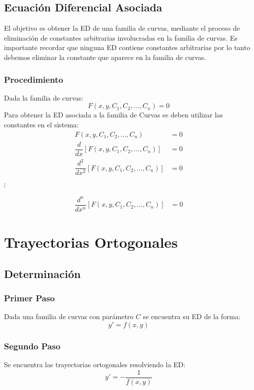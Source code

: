 \subsection{Ecuación Diferencial Asociada}
El objetivo es obtener la ED de una familia de curvas, mediante el proceso de eliminación de constantes arbitrarias involucradas en la familia de curvas. Es importante recordar que ninguna ED contiene constantes arbitrarias por lo tanto debemos eliminar la constante que aparece en la familia de curvas.
\subsubsection{Procedimiento}
Dada la familia de curvas:
$$F(x,y,C_1,C_2,\ldots,C_n)=0$$
Para obtener la ED asociada a la familia de Curvas se deben utilizar las constantes en el sistema:
\begin{align*}
F(x,y,C_1,C_2,\ldots,C_n) & = 0 \\
\dfrac{d}{dx}\left[ F(x,y,C_1,C_2,\ldots,C_n)\right]  & = 0 \\
\dfrac{d^2}{dx^2}\left[ F(x,y,C_1,C_2,\ldots,C_n)\right]  & = 0 
\end{align*}
\begin{center}
$\vdots $
\end{center}
\begin{align*}
\dfrac{d^n}{dx^n}\left[ F(x,y,C_1,C_2,\ldots,C_n)\right]  & = 0 
\end{align*}
\section{Trayectorias Ortogonales}
\subsection{Determinación}
\subsubsection{Primer Paso}
Dada una familia de curvas con parámetro $C$ se encuentra su ED de la forma:
$$y'=f(x,y)$$
\subsubsection{Segundo Paso}
Se encuentra las trayectorias ortogonales resolviendo la ED:
$$y' = -\dfrac{1}{f(x,y)}$$